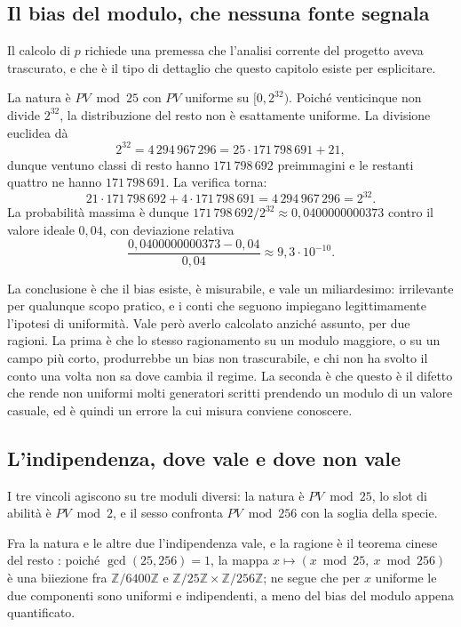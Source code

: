 \subsection{Il bias del modulo, che nessuna fonte segnala}

Il calcolo di $p$ richiede una premessa che l'analisi corrente del progetto aveva trascurato, e che è il tipo di dettaglio che questo capitolo esiste per esplicitare.

La natura è $PV \bmod 25$ con $PV$ uniforme su $[0, 2^{32})$. Poiché venticinque non divide $2^{32}$, la distribuzione del resto non è esattamente uniforme. La divisione euclidea dà
\[
2^{32} = 4\,294\,967\,296 = 25 \cdot 171\,798\,691 + 21,
\]
dunque ventuno classi di resto hanno $171\,798\,692$ preimmagini e le restanti quattro ne hanno $171\,798\,691$. La verifica torna:
\[
21 \cdot 171\,798\,692 + 4 \cdot 171\,798\,691 = 4\,294\,967\,296 = 2^{32}.
\]
La probabilità massima è dunque $171\,798\,692 / 2^{32} \approx 0{,}0400000000373$ contro il valore ideale $0{,}04$, con deviazione relativa
\[
\frac{0{,}0400000000373 - 0{,}04}{0{,}04} \approx 9{,}3 \cdot 10^{-10}.
\]

La conclusione è che il bias esiste, è misurabile, e vale un miliardesimo: irrilevante per qualunque scopo pratico, e i conti che seguono impiegano legittimamente l'ipotesi di uniformità. Vale però averlo calcolato anziché assunto, per due ragioni. La prima è che lo stesso ragionamento su un modulo maggiore, o su un campo più corto, produrrebbe un bias non trascurabile, e chi non ha svolto il conto una volta non sa dove cambia il regime. La seconda è che questo è il difetto che rende non uniformi molti generatori scritti prendendo un modulo di un valore casuale, ed è quindi un errore la cui misura conviene conoscere.

\subsection{L'indipendenza, dove vale e dove non vale}

I tre vincoli agiscono su tre moduli diversi: la natura è $PV \bmod 25$, lo slot di abilità è $PV \bmod 2$, e il sesso confronta $PV \bmod 256$ con la soglia della specie.

Fra la natura e le altre due l'indipendenza vale, e la ragione è il teorema cinese del resto \cite{knuth2}: poiché $\gcd(25, 256) = 1$, la mappa $x \mapsto (x \bmod 25,\ x \bmod 256)$ è una biiezione fra $\mathbb{Z}/6400\mathbb{Z}$ e $\mathbb{Z}/25\mathbb{Z} \times \mathbb{Z}/256\mathbb{Z}$; ne segue che per $x$ uniforme le due componenti sono uniformi e indipendenti, a meno del bias del modulo appena quantificato.

